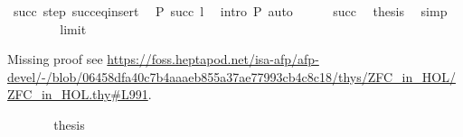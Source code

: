 \begin{isabellebody}
\ succ\ step\ succ{\isacharunderscore}{\kern0pt}eq{\isacharunderscore}{\kern0pt}insert\ \isamarkupfalse%
\ {\isachardoublequoteopen}P\ {\isacharparenleft}{\kern0pt}succ\ l{\isacharparenright}{\kern0pt}{\isachardoublequoteclose}\ \isamarkupfalse%
\ {\isacharparenleft}{\kern0pt}intro\ P{\isacharparenleft}{\kern0pt}{}{\isacharparenright}{\kern0pt}{\isacharparenright}{\kern0pt}\ auto\isanewline
\ \ \ \ \isamarkupfalse%
\ succ\ \isamarkupfalse%
\ {\isacharquery}{\kern0pt}thesis\ \isamarkupfalse%
\ simp\isanewline
\ \ \isamarkupfalse%
\isanewline
\ \ \ \ \isamarkupfalse%
\ limit%
\begin{isamarkuptext}%
Missing proof see 
\url{https://foss.heptapod.net/isa-afp/afp-devel/-/blob/06458dfa40c7b4aaaeb855a37ae77993cb4c8c18/thys/ZFC_in_HOL/ZFC_in_HOL.thy\#L991}.%
\end{isamarkuptext}\isamarkuptrue%
\ \ \ \ \isamarkupfalse%
\ \isamarkupfalse%
\ {\isacharquery}{\kern0pt}thesis\ \isamarkupfalse%
\isanewline
\ \ \isamarkupfalse%
\isanewline
{}\isamarkupfalse%
%
\endisatagproof
{\isafoldproof}%
%
\isadelimproof
\isanewline
%
\endisadelimproof
\isanewline
{}\isamarkupfalse%
\isanewline
%
\isadelimtheory
\isanewline
%
\endisadelimtheory
%
\isatagtheory
{}\isamarkupfalse%
%
\endisatagtheory
{\isafoldtheory}%
%
\isadelimtheory
%
\endisadelimtheory
%
\end{isabellebody}%
\endinput
